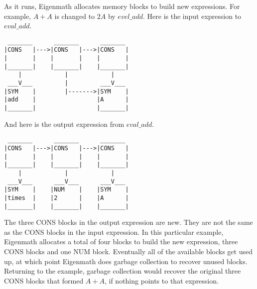\noindent
As it runs, Eigenmath allocates memory blocks to build new expressions.
For example, $A+A$ is changed to $2A$ by $evel\_add$.
Here is the input expression to $eval\_add$.
\begin{verbatim}
 _______      _______      _______
|CONS   |--->|CONS   |--->|CONS   |
|       |    |       |    |       |
|_______|    |_______|    |_______|
    |            |            |
 ___V___         |         ___V___
|SYM    |        |------->|SYM    |
|add    |                 |A      |
|_______|                 |_______|
\end{verbatim}

\bigskip
\noindent
And here is the output expression from $eval\_add$.
\begin{verbatim}
 _______      _______      _______
|CONS   |--->|CONS   |--->|CONS   |
|       |    |       |    |       |
|_______|    |_______|    |_______|
    |            |            |
 ___V___      ___V___      ___V___
|SYM    |    |NUM    |    |SYM    |
|times  |    |2      |    |A      |
|_______|    |_______|    |_______|
\end{verbatim}

\bigskip
\noindent
The three CONS blocks in the output expression are new.
They are not the same as the CONS blocks in the input expression.
In this particular example, Eigenmath allocates a total of four blocks
to build the new expression,
three CONS blocks and one NUM block.
Eventually all of the available blocks get used up, at which point Eigenmath
does garbage collection to recover unused blocks.
Returning to the example, garbage collection would recover the original
three CONS blocks that formed $A+A$, if nothing points to that expression.
